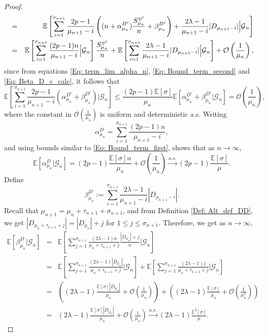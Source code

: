 \documentclass{article}
\numberwithin{equation}{section}
\newcommand{\GG}{\mbox{${\mathcal G}$}}
\newcommand{\OO}{\mbox{${\mathcal O}$}}
\newcommand{\sDD}{\tiny{\mbox{${\mathcal D}$}}}
\newcommand{\1}{\mathbf{1}}
\newcommand{\0}{\mathbf{0}}
\newcommand{\E}{\mbox{${\mathbb E}$}}
\begin{document}
\begin{proof}
\begin{eqnarray*}
    \nonumber &=& \E \left[ \sum_{i=1}^{\sigma_{n+1}} \frac{2p-1}{\mu_{n+1}-i}\left((n+ \alpha_{\mu_n}^{D^c})  \frac{S_{\mu_n}^{\sDD^c}}{n} + \beta_{\mu_n}^{D^c}   \right) + \frac{2\lambda-1}{\mu_{n+1}-i}|D_{\mu_{n+1}-i}| \Big \vert \GG_{n} \right]\\
    &=& \E \left[ \sum_{i=1}^{\sigma_{n+1}} \frac{(2p-1)n}{\mu_{n+1}-i} \Big \vert \GG_{n} \right]  \frac{S_{\mu_n}^{\sDD^c}}{n}  + \E \left[ \sum_{i=1}^{\sigma_{n+1}} \frac{2\lambda-1}{\mu_{n+1}-i}|D_{\mu_{n+1}-i}| \Big \vert \GG_{n} \right] + \mathcal{O}\left(\frac{1}{\mu_n}\right),
\end{eqnarray*}
since from equations \eqref{Eq: term_lim_alpha_n}, \eqref{Eq: Bound_term_second} and \eqref{Eq: Beta_D_c_calc}, it follows that \[\E \left[ \sum_{i=1}^{\sigma_{n+1}} \frac{2p-1}{\mu_{n+1}-i}\left( \alpha_{\mu_n}^{D^c}+ \beta_{\mu_n}^{D^c}\right)\Big \vert \GG_{n} \right] \leq \frac{(2p-1)\E[\sigma]}{\mu_n}\E \left[ \alpha_{\mu_n}^{D^c}+ \beta_{\mu_n}^{D^c}\Big \vert \GG_{n} \right]= \OO \left(\frac{1}{\mu_n}\right), \]
where the constant in $\OO \left(\frac{1}{\mu_n}\right)$ is uniform and deterministic a.s.
Writing 
\[
\alpha_{\mu_n}^{D}= \sum_{i=1}^{\sigma_{n+1}} \frac{(2p-1)n}{\mu_{n+1}-i}, 
\]
and using bounds similar to \eqref{Eq: Bound_term_first}, shows that as $n \to \infty$, 
\begin{equation}
     \E[\alpha_{\mu_n}^{D} \vert \GG_n] = (2p-1)\frac{\E[\sigma]n}{\mu_n} + \mathcal{O}\left(\frac{1}{\mu_n}\right) \stackrel{a.s.}{\longrightarrow} (2p-1)\frac{\E[\sigma]}{\mu}. 
\end{equation}
Define 
\[
\beta_{\mu_n}^{D} := \sum_{i=1}^{\sigma_{n+1}} \frac{2\lambda-1}{\mu_{n+1}-i}|D_{\mu_{n+1}-i}|.
\]
Recall that $\mu_{n+1}=\mu_{n}+\tau_{n+1}+\sigma_{n+1}$, and from Definition \ref{Def: Alt_def_DD}, we get  $|D_{\mu_n+\tau_{n+1}+j}| = |D_{\mu_n}|+j$ for $1 \le j \le \sigma_{n+1}$. Therefore, we get as $n \to \infty$, 
\begin{eqnarray}
     \E[\beta_{\mu_n}^{D} \vert \GG_n] &=&  \E \left[ \sum_{j=1}^{\sigma_{n+1}} \frac{(2\lambda-1)n}{\mu_{n}+\tau_{n+1}+j}\frac{|D_{\mu_{n}}|+j}{n} \Big \vert \GG_{n} \right] \nonumber\\
      &=&  \E \left[ \sum_{j=1}^{\sigma_{n+1}} \frac{(2\lambda-1)|D_{\mu_n}|} {\mu_{n}+\tau_{n+1}+j} \Big \vert \GG_{n} \right]  + \E \left[ \sum_{j=1}^{\sigma_{n+1}} \frac{(2\lambda-1)j}{\mu_{n}+\tau_{n+1}+j}\Big \vert \GG_{n} \right] \nonumber\\
     &=& \left((2\lambda-1)\frac{\E[\sigma]|D_{\mu_{n}}|}{\mu_n} + \mathcal{O}\left(\frac{1}{\mu_n}\right)\right) + \left((2\lambda-1)\frac{\E[\sigma]}{\mu_n} +\mathcal{O}\left(\frac{1}{\mu_n^2}\right)\right)\nonumber\\
     &=& (2\lambda-1)\frac{\E[\sigma]|D_{\mu_{n}}|}{\mu_n} + \mathcal{O}\left(\frac{1}{\mu_n}\right)\stackrel{a.s.}{\longrightarrow}(2\lambda-1)\frac{\E^2[\sigma]}{\mu}.
\end{eqnarray}
\end{proof}
\end{document}
